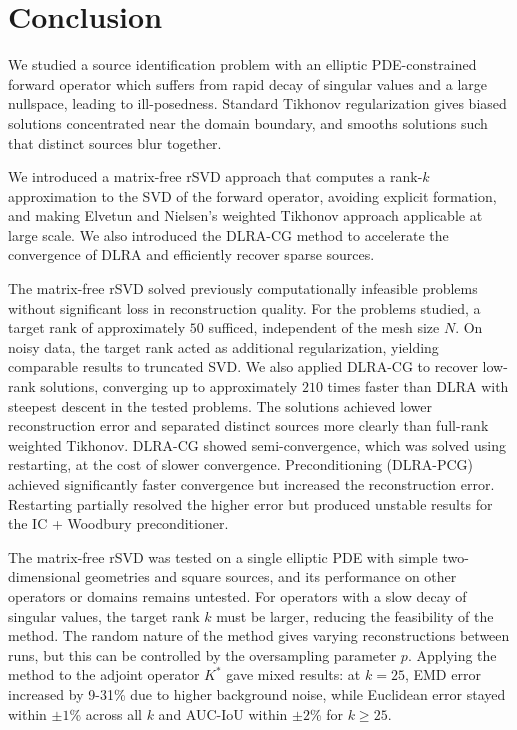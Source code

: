 \section{Conclusion}\label{sec:conclusion}
We studied a source identification problem with an elliptic PDE-constrained forward operator which suffers from rapid decay of singular values and a large nullspace, leading to ill-posedness. Standard Tikhonov regularization gives biased solutions concentrated near the domain boundary, and smooths solutions such that distinct sources blur together.

We introduced a matrix-free rSVD approach that computes a rank-$k$ approximation to the SVD of the forward operator, avoiding explicit formation, and making Elvetun and Nielsen's weighted Tikhonov approach applicable at large scale. We also introduced the DLRA-CG method to accelerate the convergence of DLRA and efficiently recover sparse sources.

The matrix-free rSVD solved previously computationally infeasible problems without significant loss in reconstruction quality. For the problems studied, a target rank of approximately $50$ sufficed, independent of the mesh size $N$. On noisy data, the target rank acted as additional regularization, yielding comparable results to truncated SVD.
We also applied DLRA-CG to recover low-rank solutions, converging up to approximately $210$ times faster than DLRA with steepest descent in the tested problems. The solutions achieved lower reconstruction error and separated distinct sources more clearly than full-rank weighted Tikhonov. DLRA-CG showed semi-convergence, which was solved using restarting, at the cost of slower convergence. Preconditioning (DLRA-PCG) achieved significantly faster convergence but increased the reconstruction error. Restarting partially resolved the higher error but produced unstable results for the IC + Woodbury preconditioner.

The matrix-free rSVD was tested on a single elliptic PDE with simple two-dimensional geometries and square sources, and its performance on other operators or domains remains untested. For operators with a slow decay of singular values, the target rank $k$ must be larger, reducing the feasibility of the method. The random nature of the method gives varying reconstructions between runs, but this can be controlled by the oversampling parameter $p$. Applying the method to the adjoint operator $K^*$ gave mixed results: at $k = 25$, EMD error increased by 9-31\% due to higher background noise, while Euclidean error stayed within $\pm 1$\% across all $k$ and AUC-IoU within $\pm 2$\% for $k \geq 25$.

